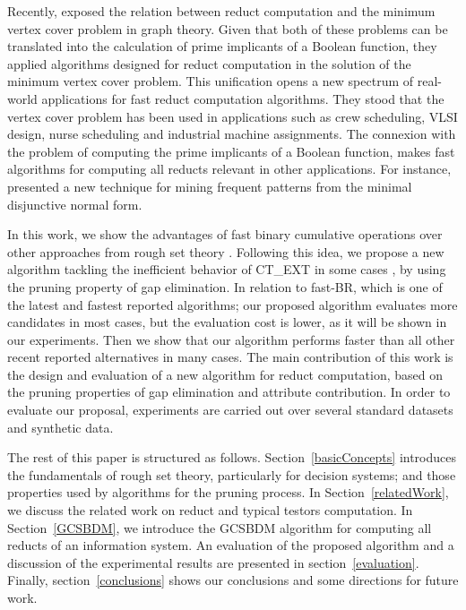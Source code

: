 \documentclass[authoryear,preprint,review,12pt]{elsarticle}
\begin{document}
  Recently, \cite{chen2015} exposed the relation between reduct computation and the minimum vertex cover
  problem in graph theory. Given that both of these problems can be translated into the calculation of
  prime implicants of a Boolean function, they applied algorithms designed for reduct computation in the
  solution of the minimum vertex cover problem. This unification opens a new spectrum of real-world applications
  for fast reduct computation algorithms. They stood that the vertex cover problem has been used in applications 
  such as crew scheduling, VLSI design, nurse scheduling and industrial machine assignments.
  The connexion with the problem of computing the prime implicants of a Boolean function, makes fast 
  algorithms for computing all reducts relevant in other applications. For instance, \cite{Li2015} presented
  a new technique for mining frequent patterns from the minimal disjunctive normal form.

  In this work, we show the advantages of fast binary cumulative operations \citep{Sanchez10,Lias13} over other 
  approaches from rough set theory \citep{WangP07,Jensen14}. Following this idea, we propose a new algorithm tackling the inefficient behavior of CT\_EXT in some cases \citep{Alba14}, by using the pruning property of gap elimination. In relation to fast-BR, which is one of the latest and fastest reported algorithms; our proposed algorithm evaluates more candidates in most cases, but the evaluation cost is lower, as it will be shown in our experiments. Then we show that our algorithm performs faster than all other recent reported alternatives in
  many cases. 
  The main contribution of this work is the design and evaluation of a new algorithm for reduct computation,
  based on  the pruning properties of gap elimination and attribute contribution. In order to evaluate our proposal, experiments are carried out over several standard datasets \citep{Bache13} and synthetic data.
  
  The rest of this paper is structured as follows. Section~\ref{basicConcepts} introduces the fundamentals of
  rough set theory, particularly for decision systems; and those properties used by algorithms for the pruning
  process. 
  In Section~\ref{relatedWork}, we discuss the related work on reduct and typical 
  testors computation.  In Section~\ref{GCSBDM}, we introduce the GCSBDM algorithm for computing all reducts of an
  information system. An evaluation of the proposed algorithm and a discussion of the experimental results are 
  presented in section~\ref{evaluation}. Finally, section~\ref{conclusions} shows our conclusions and some
  directions for future work.
   
\end{document}
